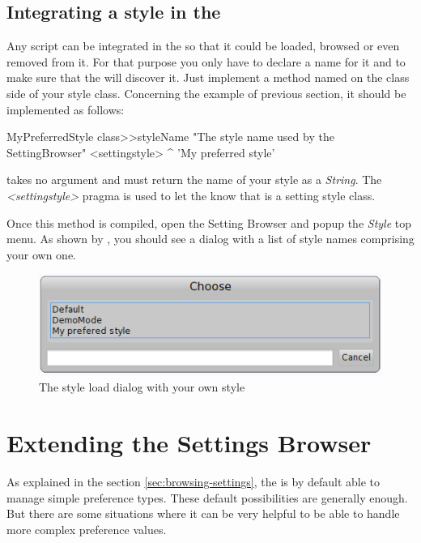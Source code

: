 \documentclass[a4paper,10pt,twoside]{book}
\begin{document}
{\subsection{Integrating a style in the \setbrowser}
Any script can be integrated in the \setbrowser so that it could be loaded, browsed or even removed from it. For that purpose you only have to declare a name for it and to make sure that the \setbrowser will discover it. Just implement a method named  on the class side of your style class. Concerning the example of previous section, it should be implemented as follows:

\begin{code}{}
MyPreferredStyle class>>styleName
	"The style name used by the SettingBrowser"
	<settingstyle>
	^ 'My preferred style'
\end{code}

 takes no argument and must return the name of your style as a \textit{String}. The \textit{<settingstyle>} pragma is used to let the \setbrowser know that  is a setting style class.

Once this method is compiled, open the Setting Browser and popup the \textit{Style} top menu. As shown by , you should see a dialog with a list of style names comprising your own one.

\begin{figure}[tbh]
\begin{center}
\includegraphics[scale=0.4]{setting-style-load-dialog}
\caption{The style load dialog with your own style}
\end{center}
\end{figure}


\section{Extending the Settings Browser}
\label{sec:ExtendingTheSettingsBrowser}
As explained in the section \ref{sec:browsing-settings}, the \setbrowser is by default able to manage simple preference types. These default possibilities are generally enough. But there are some situations where it can be very helpful to be able to handle more complex preference values. 

}
\end{document}
